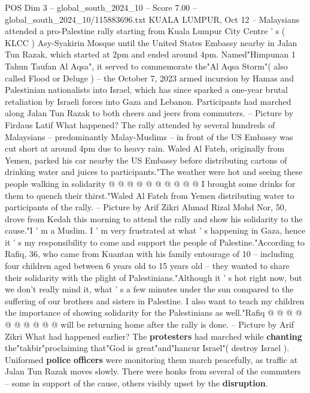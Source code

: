 \begin{textsample}{POS Dim 3 – global\_south\_2024\_10 – Score 7.00 – global\_south\_2024\_10/115883696.txt}  \label{ex:f3_pos_405}
KUALA LUMPUR, Oct 12 -- Malaysians attended a pro-Palestine rally starting from Kuala Lumpur City Centre ' s ( KLCC ) Asy-Syakirin Mosque until the United States Embassy nearby in Jalan Tun Razak, which started at 2pm and ended around 4pm.
Named"Himpunan 1 Tahun Taufan Al Aqsa", it served to commemorate the"Al Aqsa Storm"( also called Flood or Deluge ) -- the October 7, 2023 armed incursion by Hamas and Palestinian nationalists into Israel, which has since sparked a one-year brutal retaliation by Israeli forces into Gaza and Lebanon.
Participants had marched along Jalan Tun Razak to both cheers and jeers from commuters. -- Picture by Firdaus Latif What happened?
The rally attended by several hundreds of Malaysians -- predominantly Malay-Muslims -- in front of the US Embassy was cut short at around 4pm due to heavy rain.
Waled Al Fateh, originally from Yemen, parked his car nearby the US Embassy before distributing cartons of drinking water and juices to participants."The weather were hot and seeing these people walking in solidarity @ @ @ @ @ @ @ @ @ @ I brought some drinks for them to quench their thirst."Waled Al Fateh from Yemen distributing water to participants of the rally. -- Picture by Arif Zikri Ahmad Rizal Mohd Nor, 50, drove from Kedah this morning to attend the rally and show his solidarity to the cause."I ' m a Muslim.
I ' m very frustrated at what ' s happening in Gaza, hence it ' s my responsibility to come and support the people of Palestine."According to Rafiq, 36, who came from Kuantan with his family entourage of 10 -- including four children aged between 6 years old to 15 years old -- they wanted to share their solidarity with the plight of Palestinians."Although it ' s hot right now, but we don't really mind it, what ' s a few minutes under the sun compared to the suffering of our brothers and sisters in Palestine.
I also want to teach my children the importance of showing solidarity for the Palestinians as well."Rafiq @ @ @ @ @ @ @ @ @ @ will be returning home after the rally is done. -- Picture by Arif Zikri What had happened earlier?
The \textbf{protesters} had marched while \textbf{chanting} the"takbir"proclaiming that"God is great"and"hancur Israel"( destroy Israel ).
Uniformed \textbf{police} \textbf{officers} were monitoring them march peacefully, as traffic at Jalan Tun Razak moves slowly.
There were honks from several of the commuters -- some in support of the cause, others visibly upset by the \textbf{disruption}.

\end{textsample}
